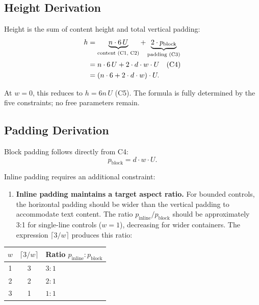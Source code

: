 \subsection{Height Derivation}

Height is the sum of content height and total vertical padding:
\begin{align}
h &= \underbrace{n \cdot 6\,U}_{\text{content (C1, C2)}}
   + \underbrace{2 \cdot p_{\text{block}}}_{\text{padding (C3)}} \notag \\
  &= n \cdot 6\,U + 2 \cdot d \cdot w \cdot U \quad \text{(C4)} \notag \\
  &= (n \cdot 6 + 2 \cdot d \cdot w) \cdot U. \label{eq:height-derived}
\end{align}

At $w = 0$, this reduces to $h = 6n\,U$ (C5). The formula is fully determined by the five constraints; no free parameters remain.

\subsection{Padding Derivation}

Block padding follows directly from C4:
\begin{equation}
p_{\text{block}} = d \cdot w \cdot U.
\end{equation}

Inline padding requires an additional constraint:

\begin{enumerate}
  \item[\textbf{C6.}] \textbf{Inline padding maintains a target aspect ratio.}
  For bounded controls, the horizontal padding should be wider than the vertical padding to accommodate text content. The ratio $p_{\text{inline}} / p_{\text{block}}$ should be approximately 3:1 for single-line controls ($w = 1$), decreasing for wider containers. The expression $\lceil 3/w \rceil$ produces this ratio:
\end{enumerate}

\begin{center}
\begin{tabular}{ccl}
\toprule
$w$ & $\lceil 3/w \rceil$ & Ratio $p_{\text{inline}} : p_{\text{block}}$ \\
\midrule
1 & 3 & $3:1$ \\
2 & 2 & $2:1$ \\
3 & 1 & $1:1$ \\
\bottomrule
\end{tabular}
\end{center}

